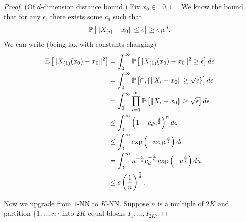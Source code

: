 \begin{proof}
	(Of $d$-dimension distance bound.) Fix $x_0 \in [0,1]$. We know the bound that for any $\epsilon$, there exists some $c_d$ such that \[
		\P\left[\|X_{(i)} - x_0\| \le \epsilon\right] \ge c_d \epsilon^{d}
	.\] 
	We can write (being lax with constants changing)
	\begin{align*}
		\E\left[\|X_{(1)}(x_0) - x_0\|^2\right] &= \int_{0}^{\infty} \P\left[\|X_{(1)}(x_0) - x_0\|^2 \ge \epsilon\right] d\epsilon \\ 
		&= \int_{0}^{\infty} \P\left[\cap_i \{\|X_i - x_0\| \ge \sqrt{\epsilon} \}\right] d\epsilon  \\
		&= \int_{0}^{\infty}  \prod_{i=1}^{n} \P\left[\|X_i - x_0\|\ge \sqrt{\epsilon} \right]d\epsilon \\
		&\le \int_{0}^{\infty} \left( 1 - c_d \epsilon^{\frac{d}{2}} \right)^{n} d\epsilon \\
		&\le \int_{0}^{\infty}  \operatorname{exp}\left(-n c_d \epsilon^{\frac{d}{2}}\right) d\epsilon \\
		&= \int_{0}^{\infty} n^{-\frac{2}{d}} c_d ^{-\frac{2}{d}} \operatorname{exp}\left(-u^{\frac{d}{2}}\right)du \\
		&\le c\left( \frac{1}{n} \right)^{\frac{2}{d}}
	.\end{align*}
	
	Now we upgrade from $1$-NN to $K$-NN. Suppose $n$ is a multiple of $2K$ and partition $\{1,\ldots,n\}$ into $2K$ equal blocks $I_1,\ldots,I_{2K}$.

\end{proof}
